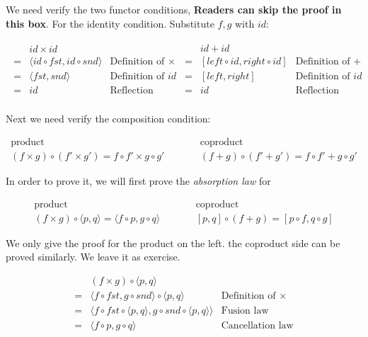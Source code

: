 \documentclass{article}
\begin{document}
\begin{mdframed}
We need verify the two functor conditions, \textbf{Readers can skip the proof in this box}. For the identity condition. Substitute $f, g$ with $id$:

\[
\begin{array}{lr}
  \begin{array}{cll}
    & id \times id & \\
  = & \langle id \circ fst, id \circ snd \rangle & \text{Definition of $\times$} \\
  = & \langle fst, snd \rangle & \text{Definition of $id$} \\
  = & id & \text{Reflection law} \\
  \end{array}
  &
  \begin{array}{cll}
    & id + id & \\
  = & [ left \circ id, right \circ id ] & \text{Definition of $+$} \\
  = & [ left, right] & \text{Definition of $id$} \\
  = & id & \text{Reflection law} \\
  \end{array}
\end{array}
\]

Next we need verify the composition condition:

\[
\begin{array}{ccc}
\text{product} & \quad \quad & \text{coproduct} \\
 (f \times g) \circ (f' \times g') = f \circ f' \times g \circ g'
 & \quad \quad &
 (f + g) \circ (f' + g') = f \circ f' + g \circ g'
\end{array}
\]

In order to prove it, we will first prove the {\em absorption law} for

\[
\begin{array}{ccc}
  \text{product} & \quad \quad & \text{coproduct} \\
  (f \times g) \circ \langle p, q \rangle = \langle f \circ p, g \circ q \rangle
  & \quad \quad &
  [p, q] \circ (f + g) = [p \circ f, q \circ g]
\end{array}
\]

We only give the proof for the product on the left. the coproduct side can be proved similarly. We leave it as exercise.

\[
\begin{array}{cll}
   & (f \times g) \circ \langle p, q \rangle & \\
 = & \langle f \circ fst, g \circ snd \rangle \circ \langle p, q \rangle & \text{Definition of $\times$} \\
 = & \langle f \circ fst \circ \langle p, q \rangle, g \circ snd \circ \langle p, q \rangle \rangle & \text{Fusion law} \\
 = & \langle f \circ p, g \circ q \rangle & \text{Cancellation law} \\
\end{array}
\]


\end{mdframed}
\end{document}
